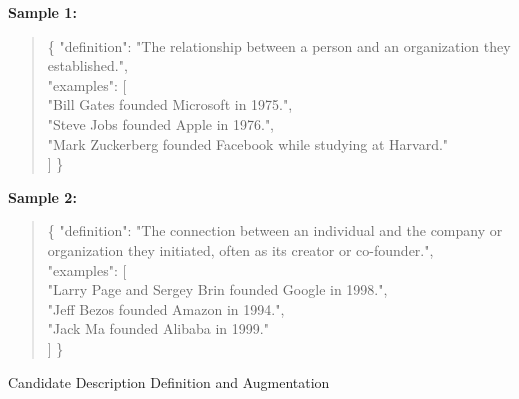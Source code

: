 \begin{table*}[ht]
\begin{mdframed}[linewidth=1pt]
        \textbf{Sample 1:} \\
        \begin{quote}
        \{
            "definition": "The relationship between a person and an organization they established.", \\
            "examples": [ \\
            \quad "Bill Gates founded Microsoft in 1975.", \\
            \quad "Steve Jobs founded Apple in 1976.", \\
            \quad "Mark Zuckerberg founded Facebook while studying at Harvard." \\
            ]
        \}
        \end{quote}

        \vspace{5pt} %

        \textbf{Sample 2:} \\
        \begin{quote}
        \{
            "definition": "The connection between an individual and the company or organization they initiated, often as its creator or co-founder.", \\
            "examples": [ \\
            \quad "Larry Page and Sergey Brin founded Google in 1998.", \\
            \quad "Jeff Bezos founded Amazon in 1994.", \\
            \quad "Jack Ma founded Alibaba in 1999." \\
            ]
        \}
        \end{quote}
    \end{mdframed}

    \caption{Candidate Description Definition and Augmentation}
    \label{tab:prompt_stability3}
\end{table*}